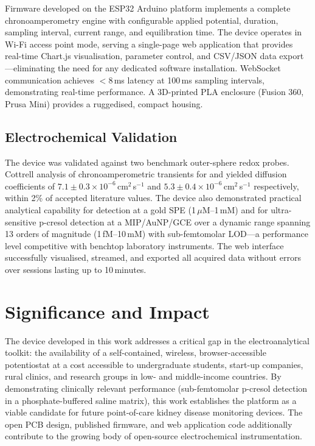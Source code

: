 Firmware developed on the ESP32 Arduino platform implements a complete chronoamperometry engine with configurable applied potential, duration, sampling interval, current range, and equilibration time. The device operates in Wi-Fi access point mode, serving a single-page web application that provides real-time Chart.js visualisation, parameter control, and CSV/JSON data export—eliminating the need for any dedicated software installation. WebSocket communication achieves $<$8\,ms latency at 100\,ms sampling intervals, demonstrating real-time performance. A 3D-printed PLA enclosure (Fusion 360, Prusa Mini) provides a ruggedised, compact housing.

\subsection{Electrochemical Validation}

The device was validated against two benchmark outer-sphere redox probes. Cottrell analysis of chronoamperometric transients for \ferrocene{} and \ruhex{} yielded diffusion coefficients of $7.1 \pm 0.3 \times 10^{-6}$\,cm$^2$\,s$^{-1}$ and $5.3 \pm 0.4 \times 10^{-6}$\,cm$^2$\,s$^{-1}$ respectively, within 2\% of accepted literature values. The device also demonstrated practical analytical capability for  detection at a gold SPE (1\,$\mu$M--1\,mM) and for ultra-sensitive p-cresol detection at a MIP/AuNP/GCE over a dynamic range spanning 13 orders of magnitude (1\,fM--10\,mM) with sub-femtomolar LOD—a performance level competitive with benchtop laboratory instruments. The web interface successfully visualised, streamed, and exported all acquired data without errors over sessions lasting up to 10\,minutes.

\section{Significance and Impact}
\label{sec:significance}

The device developed in this work addresses a critical gap in the electroanalytical toolkit: the availability of a self-contained, wireless, browser-accessible potentiostat at a cost accessible to undergraduate students, start-up companies, rural clinics, and research groups in low- and middle-income countries. By demonstrating clinically relevant performance (sub-femtomolar p-cresol detection in a phosphate-buffered saline matrix), this work establishes the platform as a viable candidate for future point-of-care kidney disease monitoring devices. The open PCB design, published firmware, and web application code additionally contribute to the growing body of open-source electrochemical instrumentation.

